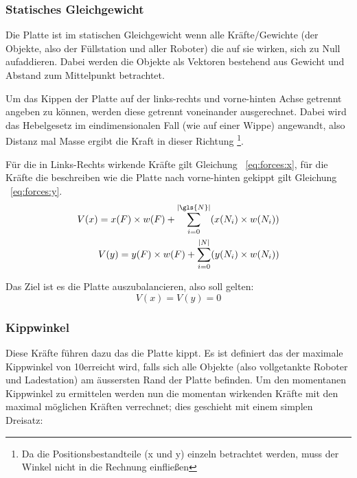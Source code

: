\subsubsection{Statisches Gleichgewicht}
Die Platte ist im statischen Gleichgewicht wenn alle Kr{\"{a}}fte/Gewichte (der Objekte, also der F{\"{u}}llstation und aller Roboter) die auf sie wirken, sich zu Null aufaddieren.
Dabei werden die Objekte als Vektoren bestehend aus Gewicht und Abstand zum Mittelpunkt betrachtet.

Um das Kippen der Platte auf der links-rechts und vorne-hinten Achse getrennt angeben zu k{\"{o}}nnen, werden diese getrennt voneinander ausgerechnet. Dabei wird das Hebelgesetz
im eindimensionalen Fall (wie auf einer Wippe) angewandt, also Distanz mal Masse ergibt die Kraft in dieser Richtung
\footnote{Da die Positionsbestandteile (x und y) einzeln betrachtet werden, muss der Winkel nicht in die Rechnung einflie{\ss}en}.

F{\"{u}}r die in Links-Rechts wirkende Kr{\"{a}}fte gilt Gleichung ~\ref{eq:forces:x}, f{\"{u}}r die Kr{\"{a}}fte die beschreiben wie die Platte nach vorne-hinten gekippt
gilt Gleichung ~\ref{eq:forces:y}.
\begin{subequations}\label{eq:forces}
\begin{align}
	V(x) = x(F) \times w(F) + \sum_{i=0}^{|\gls{N}|} ( x(N_i) \times w(N_i) ) \label{eq:forces:x}\\
	V(y) = y(F) \times w(F) + \sum_{i=0}^{|N|} ( y(N_i) \times w(N_i) ) \label{eq:forces:y}
\end{align}
\end{subequations}

Das Ziel ist es die Platte auszubalancieren, also soll gelten:
\begin{equation}\label{eq:gleichgewicht}
	V(x) = V(y) = 0
\end{equation}

\subsubsection{Kippwinkel}
Diese Kr{\"{a}}fte f{\"{u}}hren dazu das die Platte kippt. Es ist definiert das der maximale Kippwinkel von 10\textdegree erreicht wird, falls sich alle
Objekte (also vollgetankte Roboter und Ladestation) am {\"{a}}ussersten Rand der Platte befinden. Um den momentanen Kippwinkel zu ermittelen werden nun
die momentan wirkenden Kr{\"{a}}fte mit den maximal m{\"{o}}glichen Kr{\"{a}}ften verrechnet; dies geschieht mit einem simplen Dreisatz:


